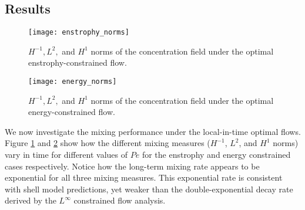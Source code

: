 \documentclass[12pt]{iopart}
\begin{document}


\subsection{Results}

\begin{figure}
\texttt{[image: enstrophy\_norms]}
\caption{$H^{-1}, L^{2},$ and $H^{1}$ norms of the concentration field under the optimal enstrophy-constrained flow.  }
\label{fig:enstrophy_norms}
\end{figure}
%
\begin{figure}
\centering
\texttt{[image: energy\_norms]}
\caption{$H^{-1}, L^{2},$ and $H^{1}$ norms of the concentration field under the optimal energy-constrained flow.}
\label{fig:energy_norms}
\end{figure}


We now investigate the mixing performance under the local-in-time optimal flows. Figure \ref{fig:enstrophy_norms} and \ref{fig:energy_norms} show how the different mixing measures ($H^{-1}$, $L^2$, and $H^{1}$ norms) vary in time for different values of $Pe$ for the enstrophy and energy constrained cases respectively. Notice how the long-term mixing rate appears to be exponential for all three mixing measures. This exponential rate is consistent with shell model predictions, yet weaker than the double-exponential decay rate derived by the $L^{\infty}$ constrained flow analysis.
\end{document}
